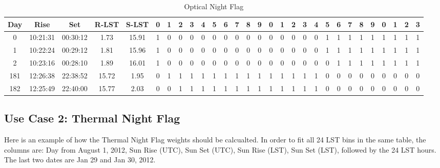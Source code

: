 \documentclass{article}
\begin{document}
\begin{table}
{\tiny
\caption{Optical Night Flag \label{tab:time}}
\begin{tabular*}{1.05\textwidth}{@{\extracolsep{\fill}}ccccccccccccccccccccccccccccc}
\hline \hline
{\bf Day} & {\bf Rise} & {\bf Set} & {\bf R-LST} & {\bf S-LST} & {\bf 0} & {\bf 1} & {\bf 2} & {\bf 3} & {\bf 4} & {\bf 5} & {\bf 6} & {\bf 7} & {\bf 8} & {\bf 9} & {\bf 0} & {\bf 1} & {\bf 2} & {\bf 3} & {\bf 4} & {\bf 5} & {\bf 6} & {\bf 7} & {\bf 8} & {\bf 9} & {\bf 0} & {\bf 1} & {\bf 2} & {\bf 3}\\
\hline
0 & 10:21:31 & 00:30:12 & 1.73 & 15.91 & 1 & 0 & 0 & 0 & 0 & 0 & 0 & 0 & 0 & 0 & 0 & 0 & 0 & 0 & 0 & 1 & 1 & 1 & 1 & 1 & 1 & 1 & 1 & 1\\
1 & 10:22:24 & 00:29:12 & 1.81 & 15.96 & 1 & 0 & 0 & 0 & 0 & 0 & 0 & 0 & 0 & 0 & 0 & 0 & 0 & 0 & 0 & 1 & 1 & 1 & 1 & 1 & 1 & 1 & 1 & 1\\
2 & 10:23:16 & 00:28:10 & 1.89 & 16.01 & 1 & 0 & 0 & 0 & 0 & 0 & 0 & 0 & 0 & 0 & 0 & 0 & 0 & 0 & 0 & 0 & 1 & 1 & 1 & 1 & 1 & 1 & 1 & 1\\
181 & 12:26:38 & 22:38:52 & 15.72 & 1.95 & 0 & 1 & 1 & 1 & 1 & 1 & 1 & 1 & 1 & 1 & 1 & 1 & 1 & 1 & 1 & 0 & 0 & 0 & 0 & 0 & 0 & 0 & 0 & 0\\
182 & 12:25:49 & 22:40:00 & 15.77 & 2.03 & 0 & 0 & 1 & 1 & 1 & 1 & 1 & 1 & 1 & 1 & 1 & 1 & 1 & 1 & 1 & 0 & 0 & 0 & 0 & 0 & 0 & 0 & 0 & 0\\


\hline \hline
\end{tabular*}
}
\end{table}

\subsection{Use Case 2: Thermal Night Flag}

Here is an example of how the Thermal Night Flag weights should be calcualted.  In order to fit all 24 LST bins in the same table, the columns are: Day from August 1, 2012, Sun Rise (UTC), Sun Set (UTC), Sun Rise (LST), Sun Set (LST), followed by the 24 LST hours.   The last two dates are Jan 29 and Jan 30, 2012.
\end{document}
